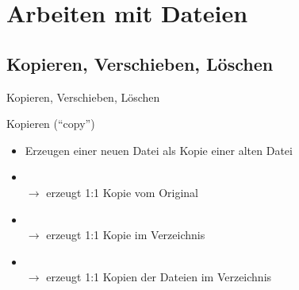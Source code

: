 \documentclass[aspectratio=43]{beamer}
\begin{document}
\section{Arbeiten mit Dateien}
\subsection{Kopieren, Verschieben, Löschen}
\begin{frame}{Kopieren, Verschieben, Löschen}
  \begin{block}{Kopieren (``copy'')}
    \begin{itemize}
      \item Erzeugen einer neuen Datei als Kopie einer alten Datei
      \item {} \\ 
          $\rightarrow$ erzeugt 1:1 Kopie vom Original
      \item {} \\ 
          $\rightarrow$ erzeugt 1:1 Kopie im Verzeichnis
      \item {} \\ 
          $\rightarrow$ erzeugt 1:1 Kopien der Dateien im Verzeichnis
    \end{itemize}
  \end{block}
\end{frame}
\end{document}
